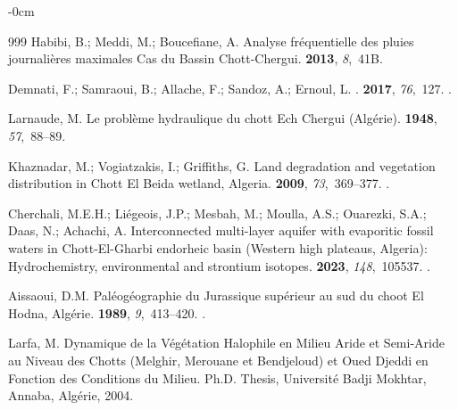 \documentclass[asi,article,accept,pdftex,moreauthors]{Definitions/mdpi}
\begin{document}
\begin{adjustwidth}{-\extralength}{0cm}
\begin{thebibliography}{999}
Habibi, B.; Meddi, M.; Boucefiane, A.
\newblock Analyse fr{\'e}quentielle des pluies journali{\`e}res maximales Cas
  du Bassin Chott-Chergui.
 {\bf 2013}, {\em 8},~41B.

Demnati, F.; Samraoui, B.; Allache, F.; Sandoz, A.; Ernoul, L.
.
 {\bf 2017}, {\em 76},~127.
.

Larnaude, M.
\newblock Le problème hydraulique du chott Ech Chergui (Algérie).
 {\bf 1948}, {\em 57},~88--89.

Khaznadar, M.; Vogiatzakis, I.; Griffiths, G.
\newblock Land degradation and vegetation distribution in Chott El Beida
  wetland, Algeria.
 {\bf 2009}, {\em 73},~369--377.
.

Cherchali, M.E.H.; Liégeois, J.P.; Mesbah, M.; Moulla, A.S.; Ouarezki, S.A.;
  Daas, N.; Achachi, A.
\newblock Interconnected multi-layer aquifer with evaporitic fossil waters in
  Chott-El-Gharbi endorheic basin (Western high plateaus, Algeria):
  Hydrochemistry, environmental and strontium isotopes.
 {\bf 2023}, {\em 148},~105537.
.

Aissaoui, D.M.
\newblock Paléogéographie du Jurassique supérieur au sud du choot El Hodna,
  Algérie.
 {\bf
  1989}, {\em 9},~413--420.
.

Larfa, M.
\newblock Dynamique de la Végétation Halophile en Milieu Aride et Semi-Aride
  au Niveau des Chotts (Melghir, Merouane et Bendjeloud) et Oued Djeddi en
  Fonction des Conditions du Milieu.
\newblock Ph.D. Thesis, Université Badji Mokhtar, Annaba, Algérie,  2004.



\end{thebibliography}
\end{adjustwidth}
\end{document}
